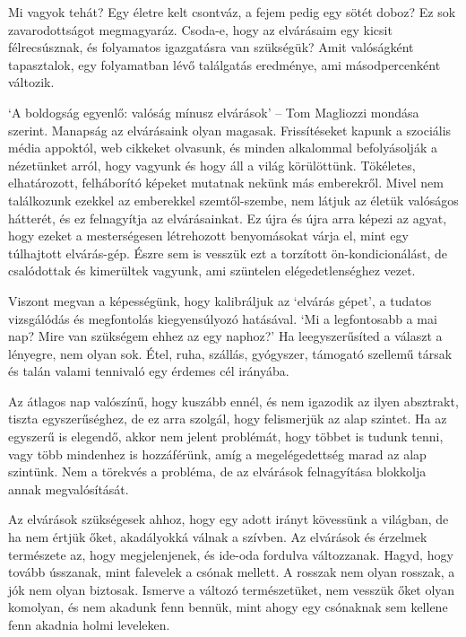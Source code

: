 \clearpage

Mi vagyok tehát? Egy életre kelt csontváz, a fejem pedig egy sötét
doboz? Ez sok zavarodottságot megmagyaráz. Csoda-e, hogy az elvárásaim
egy kicsit félrecsúsznak, és folyamatos igazgatásra van szükségük? Amit
valóságként tapasztalok, egy folyamatban lévő találgatás eredménye, ami
másodpercenként változik.

`A boldogság egyenlő: valóság mínusz elvárások' -- Tom Magliozzi mondása
szerint. Manapság az elvárásaink olyan magasak. Frissítéseket kapunk a
szociális média appoktól, web cikkeket olvasunk, és minden alkalommal
befolyásolják a nézetünket arról, hogy vagyunk és hogy áll a világ
körülöttünk. Tökéletes, elhatározott, felháborító képeket mutatnak
nekünk más emberekről. Mivel nem találkozunk ezekkel az emberekkel
szemtől-szembe, nem látjuk az életük valóságos hátterét, és ez
felnagyítja az elvárásainkat. Ez újra és újra arra képezi az agyat, hogy
ezeket a mesterségesen létrehozott benyomásokat várja el, mint egy
túlhajtott elvárás-gép. Észre sem is vesszük ezt a torzított
ön-kondicionálást, de csalódottak és kimerültek vagyunk, ami szüntelen
elégedetlenséghez vezet.


Viszont megvan a képességünk, hogy kalibráljuk az `elvárás gépet', a
tudatos vizsgálódás és megfontolás kiegyensúlyozó hatásával. `Mi a
legfontosabb a mai nap? Mire van szükségem ehhez az egy naphoz?' Ha
leegyszerűsíted a választ a lényegre, nem olyan sok. Étel, ruha,
szállás, gyógyszer, támogató szellemű társak és talán valami tennivaló
egy érdemes cél irányába.

Az átlagos nap valószínű, hogy kuszább ennél, és nem igazodik az ilyen
absztrakt, tiszta egyszerűséghez, de ez arra szolgál, hogy felismerjük
az alap szintet. Ha az egyszerű is elegendő, akkor nem jelent problémát,
hogy többet is tudunk tenni, vagy több mindenhez is hozzáférünk, amíg a
megelégedettség marad az alap szintünk. Nem a törekvés a probléma, de az
elvárások felnagyítása blokkolja annak megvalósítását.

Az elvárások szükségesek ahhoz, hogy egy adott irányt kövessünk a
világban, de ha nem értjük őket, akadályokká válnak a szívben. Az
elvárások és érzelmek természete az, hogy megjelenjenek, és ide-oda
fordulva változzanak. Hagyd, hogy tovább ússzanak, mint falevelek a
csónak mellett. A rosszak nem olyan rosszak, a jók nem olyan biztosak.
Ismerve a változó természetüket, nem vesszük őket olyan komolyan, és nem
akadunk fenn bennük, mint ahogy egy csónaknak sem kellene fenn akadnia
holmi leveleken.

